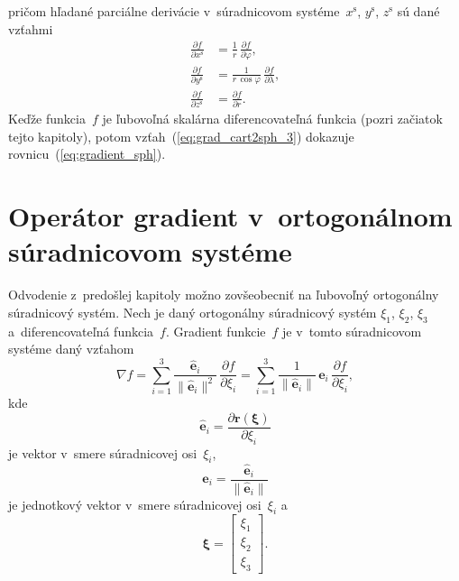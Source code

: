 \documentclass[a4paper,12pt]{book}
\let\vec\mathbf
\begin{document}
%
pričom hľadané parciálne derivácie v~súradnicovom systéme~$x^\mathrm{s}$, 
$y^\mathrm{s}$, $z^\mathrm{s}$ sú dané vzťahmi
%
\begin{equation}
\label{eq:lnof_diff_oeprators}
\begin{split}
\frac{\partial f}{\partial x^\mathrm{s}} &= \frac{1}{r} \, \frac{\partial 
f}{\partial \varphi}{,}\\
%
\frac{\partial f}{\partial y^\mathrm{s}} &= \frac{1}{r \, \cos\varphi} \, 
\frac{\partial f}{\partial \lambda}{,}\\
%
\frac{\partial f}{\partial z^\mathrm{s}} &= \frac{\partial f}{\partial r}{.}
\end{split}
\end{equation}
%
Keďže funkcia~$f$ je ľubovoľná skalárna diferencovateľná funkcia (pozri 
začiatok tejto kapitoly), potom vzťah~(\ref{eq:grad_cart2sph_3}) dokazuje 
rovnicu~(\ref{eq:gradient_sph}).




\section{Operátor gradient v~ortogonálnom súradnicovom systéme}
\label{app:gradient_in_orthogonal_coordinates}

Odvodenie z~predošlej kapitoly možno zovšeobecniť na ľubovoľný ortogonálny 
súradnicový systém.  Nech je daný ortogonálny súradnicový systém $\xi_1$, 
$\xi_2$, $\xi_3$ a~diferencovateľná funkcia~$f$.  Gradient funkcie~$f$ je 
v~tomto súradnicovom systéme daný vzťahom 
\parencite{Arfken2005,SansoGeoidDetermination}
%
\begin{equation}
\label{eq:grad_orthogonal_system}
\nabla f = \sum_{i = 1}^3 \frac{\hat{\vec e}_i}{\| \hat{\vec e}_i \|^2} \, 
\frac{\partial f}{\partial \xi_i} = \sum_{i = 1}^3 \frac{1}{\| \hat{\vec e}_i 
\|} \, \vec e_i \, \frac{\partial f}{\partial \xi_i}{,}
\end{equation}
%
kde
%
\begin{equation}
\label{eq:xi1xi2xi3_vectors}
\hat{\vec e}_i = \frac{\partial \vec r(\boldsymbol \xi)}{\partial \xi_i}
\end{equation}
%
je vektor v~smere súradnicovej osi~$\xi_i$,
%
\begin{equation}
\label{eq:xi1xi2xi3_unit_vectors}
\vec e_i = \frac{\hat{\vec e}_i}{\| \hat{\vec e}_i \|}
\end{equation}
%
je jednotkový vektor v~smere súradnicovej osi~$\xi_i$ a
%
\begin{equation}
\boldsymbol \xi =
%
\begin{bmatrix}
\xi_1\\
\xi_2\\
\xi_3
\end{bmatrix}
%
{.}
%
\end{equation}
\end{document}
